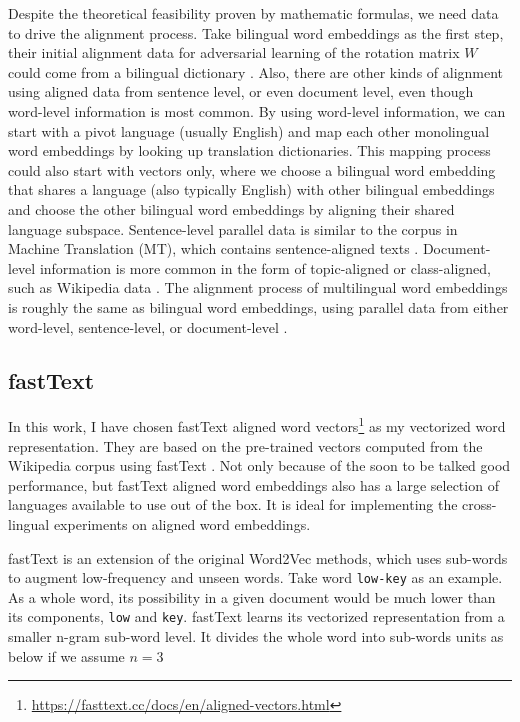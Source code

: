 \documentclass[thesis,fonts=libertine]{cluu}
\begin{document}
Despite the theoretical feasibility proven by mathematic formulas, we need data to drive the alignment process. Take bilingual word embeddings as the first step, their initial alignment data for adversarial learning of the rotation matrix $W$ could come from a bilingual dictionary \parencite{Mikolov:2013ac}. Also, there are other kinds of alignment using aligned data from sentence level, or even document level, even though word-level information is most common. By using word-level information, we can start with a pivot language (usually English) and map each other monolingual word embeddings by looking up translation dictionaries. This mapping process could also start with vectors only, where we choose a bilingual word embedding that shares a language (also typically English) with other bilingual embeddings and choose the other bilingual word embeddings by aligning their shared language subspace. Sentence-level parallel data is similar to the corpus in Machine Translation (MT), which contains sentence-aligned texts \parencite{Hermann:2013aa}. Document-level information is more common in the form of topic-aligned or class-aligned, such as Wikipedia data \parencite{vulic-moens-2013-study}. The alignment process of multilingual word embeddings is roughly the same as bilingual word embeddings, using parallel data from either word-level, sentence-level, or document-level \parencite{Ruder:2019aa}.

\subsection{fastText}

In this work, I have chosen fastText aligned word vectors\footnote{\url{https://fasttext.cc/docs/en/aligned-vectors.html}} \parencite{Joulin:2018aa} as my vectorized word representation. They are based on the pre-trained vectors computed from the Wikipedia corpus using fastText \parencite{Bojanowski:2016aa}. Not only because of the soon to be talked good performance, but fastText aligned word embeddings also has a large selection of languages available to use out of the box. It is ideal for implementing the cross-lingual experiments on aligned word embeddings.

fastText is an extension of the original Word2Vec methods, which uses sub-words to augment low-frequency and unseen words. Take word \texttt{low-key} as an example. As a whole word, its possibility in a given document would be much lower than its components, \texttt{low} and \texttt{key}. fastText learns its vectorized representation from a smaller n-gram sub-word level. It divides the whole word into sub-words units as below if we assume $n=3$
\end{document}

